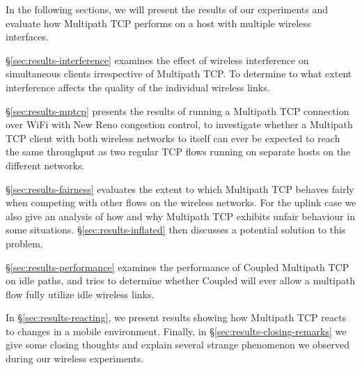 In the following sections, we will present the results of our experiments and
evaluate how Multipath TCP performs on a host with multiple wireless
interfaces.

\S\ref{sec:results-interference} examines the effect of wireless
interference on simultaneous clients irrespective of Multipath TCP.\@
To determine to what extent interference affects the quality of the
individual wireless links.

\S\ref{sec:results-mptcp} presents the results of running a Multipath TCP
connection over WiFi with New Reno congestion control, to investigate whether
a Multipath TCP client with both wireless networks to
itself can ever be expected to reach the same throughput as two regular TCP flows running on
separate hosts on the different networks.

\S\ref{sec:results-fairness} evaluates the extent to which Multipath TCP behaves
fairly when competing with other flows on the wireless networks. For the uplink
case we also give an analysis of how and why Multipath TCP exhibits unfair
behaviour in some situations. \S\ref{sec:results-inflated} then discusses a
potential solution to this problem.

\S\ref{sec:results-performance} examines the performance of Coupled Multipath
TCP on idle paths, and tries to determine whether Coupled will ever allow a
multipath flow fully utilize idle wireless links.

In \S\ref{sec:results-reacting}, we present results showing how Multipath TCP
reacts to changes in a mobile environment. Finally, in
\S\ref{sec:results-closing-remarks} we give some closing thoughts and explain
several strange phenomenon we observed during our wireless experiments.
